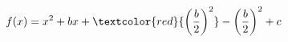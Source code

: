 \documentclass[preview]{standalone}
\begin{document}
\begin{align*}
f(x) = x^2 + bx + \textcolor{red}{\left(\frac{b}{2}\right)^2} - \left(\frac{b}{2}\right)^2 + c
\end{align*}
\end{document}
